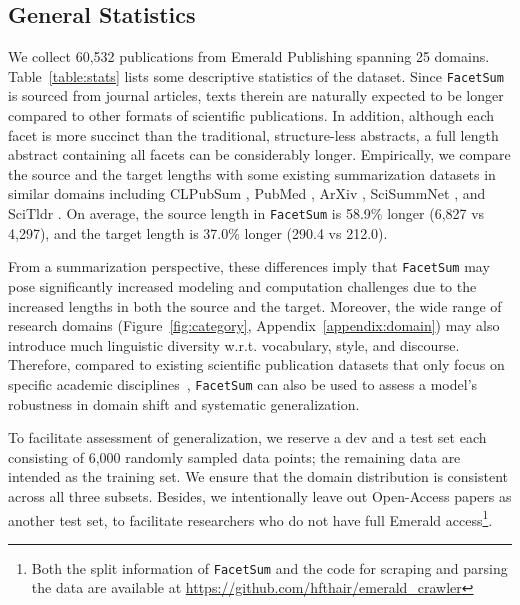 \documentclass[11pt,a4paper]{article}
\newcommand{\ours}{\texttt{FacetSum}\xspace}
\begin{document}
\subsection{General Statistics}
\label{sec:general_stats}
We collect 60,532 publications from Emerald Publishing spanning 25 domains.
Table~\ref{table:stats} lists some descriptive statistics of the dataset.
Since \ours is sourced from journal articles, texts therein are naturally expected to be longer compared to other formats of scientific publications.
In addition, although each facet is more succinct than the traditional, structure-less abstracts, a full length abstract containing all facets can be considerably longer.
Empirically, we compare the source and the target lengths 
with some existing summarization datasets in similar domains including CLPubSum \citep{collins2017supervised}, PubMed \citep{cohan2018discourse}, ArXiv \citep{cohan2018discourse}, SciSummNet \citep{yasunaga2019scisummnet}, and SciTldr \citep{cachola2020tldr}.
On average, the source length in \ours is 58.9\% longer (6,827 vs 4,297), and the target length is 37.0\% longer (290.4 vs 212.0).

From a summarization perspective, these differences imply that \ours may pose significantly increased  modeling and computation challenges due to the increased lengths in both the source and the target.
Moreover, the wide range of research domains (Figure~\ref{fig:category}, Appendix~\ref{appendix:domain}) may also introduce much linguistic diversity w.r.t. vocabulary, style, and discourse. Therefore, compared to existing scientific publication datasets that only focus on specific academic disciplines~\cite{cohan2018discourse,cachola2020tldr}, \ours can also be used to assess a model's robustness in domain shift and systematic generalization.









To facilitate assessment of generalization, we reserve a dev and a test set each consisting of 6,000 randomly sampled data points; the remaining data are intended as the training set.
We ensure that the domain distribution is consistent across all three subsets. Besides, we intentionally leave out Open-Access papers as another test set, to facilitate researchers who do not have full Emerald access\footnote{
Both the split information of \ours and the code for scraping and parsing the data are available at \url{https://github.com/hfthair/emerald_crawler}}. 
\end{document}
